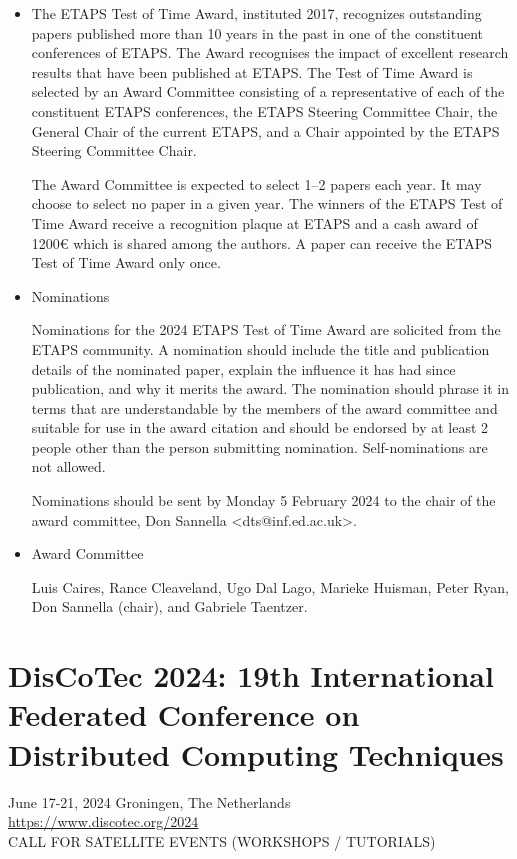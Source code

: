 \documentclass[prodmode,acmtecs]{acmsmall} %
\begin{document}
\begin{itemize}\item  The ETAPS Test of Time Award, instituted 2017, recognizes outstanding papers published more than 10 years in the past in one of the constituent conferences of ETAPS. The Award recognises the impact of excellent research results that have been published at ETAPS. The Test of Time Award is selected by an Award Committee consisting of a representative of each of the constituent ETAPS conferences, the ETAPS Steering Committee Chair, the General Chair of the current ETAPS, and a Chair appointed by the ETAPS Steering Committee Chair. 
 
  The Award Committee is expected to select 1–2 papers each year. It may choose to select no paper in a given year. The winners of the ETAPS Test of Time Award receive a recognition plaque at ETAPS and a cash award of 1200€ which is shared among the authors. A paper can receive the ETAPS Test of Time Award only once. 
 
\item  Nominations  
 
  Nominations for the 2024 ETAPS Test of Time Award are solicited from the ETAPS community. A nomination should include the title and publication details of the nominated paper, explain the influence it has had since publication, and why it merits the award. The nomination should phrase it in terms that are understandable by the members of the award committee and suitable for use in the award citation and should be endorsed by at least 2 people other than the person submitting nomination. Self-nominations are not allowed. 
 
  Nominations should be sent by Monday 5 February 2024 to the chair of the award committee, Don Sannella <dts@inf.ed.ac.uk>. 
 
\item  Award Committee 
 
  Luis Caires, Rance Cleaveland, Ugo Dal Lago, Marieke Huisman, Peter Ryan, Don Sannella (chair), and Gabriele Taentzer. 
 
\end{itemize}\section{DisCoTec 2024: 19th International Federated Conference on Distributed Computing Techniques}\label{DisCoTec2024}  June 17-21, 2024 Groningen, The Netherlands\\ 
  \href{https://www.discotec.org/2024}{https://www.discotec.org/2024}\\ 
CALL FOR SATELLITE EVENTS (WORKSHOPS / TUTORIALS) 
\end{document}
